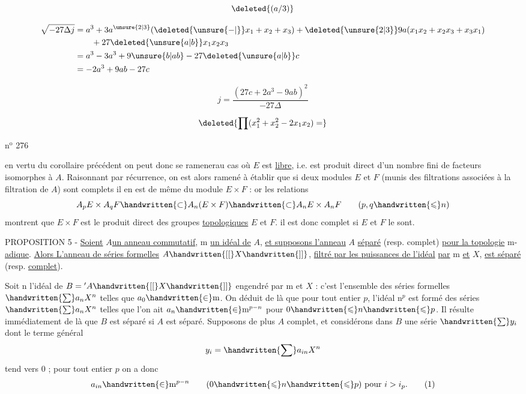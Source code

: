 \[
\deleted{(a/3)}
\]

\[
\begin{aligned}
\sqrt{-27\Delta j}&=a^3+3a^{\unsure{2|3}}(\deleted{\unsure{-|}}x_1+x_2+x_3)+\deleted{\unsure{2|3}}9a(x_1x_2+x_2x_3+x_3x_1)\\
&\qquad+27\deleted{\unsure{a|b}}x_1x_2x_3\\
&=a^3-3a^3+9\unsure{b|ab}-27\deleted{\unsure{a|b}}c\\
&=-2a^3+9ab-27c
\end{aligned}
\]

\[
\boxed{j=\frac{(27c+2a^3-9ab)^2}{-27\Delta}}
\]

\[
\deleted{\prod(x_1^2+x_2^2-2x_1x_2)=}
\]

\hfill n$^{\mathrm{o}}$ 276

en vertu du corollaire précédent on peut donc se ramener\handwritten{/}au cas où $E$ est \uline{libre}, i.e. est produit direct d'un nombre fini de facteurs isomorphes à $A$. Raisonnant par récurrence, on est alors ramené à établir que si deux modules $E$ et $F$ (munis des filtrations associées à la filtration de $A$) sont complets il en est de même du module $E\times F$ : or les relations
\[
A_p E\times A_q F\handwritten{\subset} A_n(E\times F)\handwritten{\subset} A_n E\times A_n F\qquad(p,q\handwritten{\leqslant} n)
\]
montrent que $E\times F$ est le produit direct des groupes \uline{topologiques} $E$ et $F$. il est donc complet si $E$ et $F$ le sont.

PROPOSITION 5 - \uline{Soient} $A$\uline{un anneau commutatif}, $\mathrm{m}$ \uline{un idéal de} $A$, \uline{et supposons l'anneau} $A$ \uline{séparé} (resp. complet) \uline{pour la topologie} $\mathrm{m}$-\uline{adique}. \uline{Alors L'anneau de séries formelles} $A\handwritten{[[}X\handwritten{]]}$, \uline{filtré par les puissances de l'idéal}  \uline{par} $\mathrm{m}$ \uline{et} $X$, \uline{est séparé} (resp. \uline{complet}).

Soit $\mathrm{n}$ l'idéal de $B={}'A\handwritten{[[}X\handwritten{]]}$ engendré par $\mathrm{m}$ et $X$ : c'est l'ensemble des séries formelles $\handwritten{\sum} a_n X^n$ telles que $a_0\handwritten{\in}\mathrm{m}$. On déduit de là que pour tout entier $p$, l'idéal $\mathrm{n}^p$ est formé des séries $\handwritten{\sum} a_n X^n$ telles que l'on ait $a_n\handwritten{\in}\mathrm{m}^{p-n}$ pour $0\handwritten{\leqslant} n\handwritten{\leqslant} p$. Il résulte immédiatement de là que $B$ est séparé si $A$ est séparé. Supposons de plus $A$ complet, et considérons dans $B$ une série $\handwritten{\sum} y_i$ dont le terme général
\[
y_i=\handwritten{\sum} a_{in}X^n
\]
tend vers 0 ; pour tout entier $p$ on a donc
\begingroup\makeatletter\tagsleft@true\makeatother
\[
a_{in}\handwritten{\in}\mathrm{m}^{p-n}\qquad(0\handwritten{\leqslant} n\handwritten{\leqslant} p)\ \text{pour }i>i_p.\tag*{(1)}
\]
\endgroup

